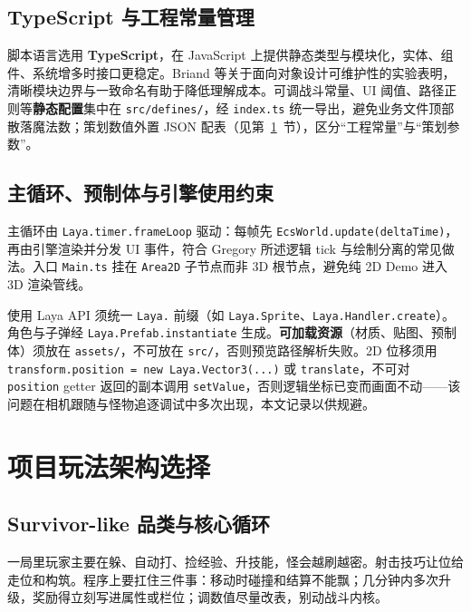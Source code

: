 \subsection{TypeScript 与工程常量管理}

脚本语言选用 \textbf{TypeScript}，在 JavaScript 上提供静态类型与模块化，实体、组件、系统增多时接口更稳定。Briand 等关于面向对象设计可维护性的实验表明，清晰模块边界与一致命名有助于降低理解成本\cite{briand2001maintainability}。可调战斗常量、UI 阈值、路径正则等\textbf{静态配置}集中在 \texttt{src/defines/}，经 \texttt{index.ts} 统一导出，避免业务文件顶部散落魔法数；策划数值外置 JSON 配表（见第~\ref{sec:gameplay-arch}~节），区分“工程常量”与“策划参数”。

\subsection{主循环、预制体与引擎使用约束}

主循环由 \texttt{Laya.timer.frameLoop} 驱动：每帧先 \texttt{EcsWorld.update(deltaTime)}，再由引擎渲染并分发 UI 事件，符合 Gregory 所述逻辑 tick 与绘制分离的常见做法\cite{gregory2018game,unitymanual2016}。入口 \texttt{Main.ts} 挂在 \texttt{Area2D} 子节点而非 3D 根节点，避免纯 2D Demo 进入 3D 渲染管线。

使用 Laya API 须统一 \texttt{Laya.} 前缀（如 \texttt{Laya.Sprite}、\texttt{Laya.Handler.create}）。角色与子弹经 \texttt{Laya.Prefab.instantiate} 生成。\textbf{可加载资源}（材质、贴图、预制体）须放在 \texttt{assets/}，不可放在 \texttt{src/}，否则预览路径解析失败。2D 位移须用 \texttt{transform.position = new Laya.Vector3(...)} 或 \texttt{translate}，不可对 \texttt{position} getter 返回的副本调用 \texttt{setValue}，否则逻辑坐标已变而画面不动——该问题在相机跟随与怪物追逐调试中多次出现，本文记录以供规避。

\section{项目玩法架构选择}
\label{sec:gameplay-arch}

\subsection{Survivor-like 品类与核心循环}

一局里玩家主要在躲、自动打、捡经验、升技能，怪会越刷越密。射击技巧让位给走位和构筑\cite{gregory2018game}。程序上要扛住三件事：移动时碰撞和结算不能飘；几分钟内多次升级，奖励得立刻写进属性或栏位；调数值尽量改表，别动战斗内核。

